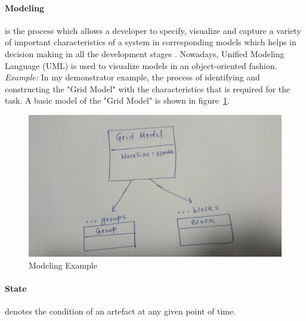 \paragraph{Modeling} is the process which allows a developer to specify, visualize and capture a variety of important characteristics of a system in corresponding models which helps in decision making in all the development stages \cite{uml}. Nowadays, Unified Modeling Language (UML) \cite{uml} is used to visualize models in an object-oriented fashion.
\newline\newline\textit{Example:} In my demonstrator example, the process of identifying and constructing the "Grid Model" with the characteristics that is required for the task. A basic model of the "Grid Model" is shown in figure~\ref{fig:Modeling_Example}.

\begin{figure}
	\includegraphics[width=1\textwidth]{figures/Modeling_Example}
	\caption{Modeling Example}
	\label{fig:Modeling_Example}
\end{figure}

\paragraph{State} denotes the condition of an artefact at any given point of time.

